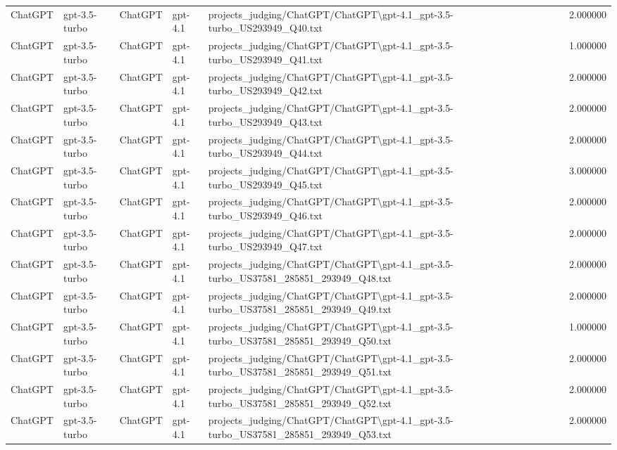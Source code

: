 \begin{table}[H]
\begin{tabular}{lllllr}
ChatGPT & gpt-3.5-turbo & ChatGPT & gpt-4.1 & projects\_judging/ChatGPT/ChatGPT\textbackslash gpt-4.1\_gpt-3.5-turbo\_US293949\_Q40.txt & 2.000000 \\
ChatGPT & gpt-3.5-turbo & ChatGPT & gpt-4.1 & projects\_judging/ChatGPT/ChatGPT\textbackslash gpt-4.1\_gpt-3.5-turbo\_US293949\_Q41.txt & 1.000000 \\
ChatGPT & gpt-3.5-turbo & ChatGPT & gpt-4.1 & projects\_judging/ChatGPT/ChatGPT\textbackslash gpt-4.1\_gpt-3.5-turbo\_US293949\_Q42.txt & 2.000000 \\
ChatGPT & gpt-3.5-turbo & ChatGPT & gpt-4.1 & projects\_judging/ChatGPT/ChatGPT\textbackslash gpt-4.1\_gpt-3.5-turbo\_US293949\_Q43.txt & 2.000000 \\
ChatGPT & gpt-3.5-turbo & ChatGPT & gpt-4.1 & projects\_judging/ChatGPT/ChatGPT\textbackslash gpt-4.1\_gpt-3.5-turbo\_US293949\_Q44.txt & 2.000000 \\
ChatGPT & gpt-3.5-turbo & ChatGPT & gpt-4.1 & projects\_judging/ChatGPT/ChatGPT\textbackslash gpt-4.1\_gpt-3.5-turbo\_US293949\_Q45.txt & 3.000000 \\
ChatGPT & gpt-3.5-turbo & ChatGPT & gpt-4.1 & projects\_judging/ChatGPT/ChatGPT\textbackslash gpt-4.1\_gpt-3.5-turbo\_US293949\_Q46.txt & 2.000000 \\
ChatGPT & gpt-3.5-turbo & ChatGPT & gpt-4.1 & projects\_judging/ChatGPT/ChatGPT\textbackslash gpt-4.1\_gpt-3.5-turbo\_US293949\_Q47.txt & 2.000000 \\
ChatGPT & gpt-3.5-turbo & ChatGPT & gpt-4.1 & projects\_judging/ChatGPT/ChatGPT\textbackslash gpt-4.1\_gpt-3.5-turbo\_US37581\_285851\_293949\_Q48.txt & 2.000000 \\
ChatGPT & gpt-3.5-turbo & ChatGPT & gpt-4.1 & projects\_judging/ChatGPT/ChatGPT\textbackslash gpt-4.1\_gpt-3.5-turbo\_US37581\_285851\_293949\_Q49.txt & 2.000000 \\
ChatGPT & gpt-3.5-turbo & ChatGPT & gpt-4.1 & projects\_judging/ChatGPT/ChatGPT\textbackslash gpt-4.1\_gpt-3.5-turbo\_US37581\_285851\_293949\_Q50.txt & 1.000000 \\
ChatGPT & gpt-3.5-turbo & ChatGPT & gpt-4.1 & projects\_judging/ChatGPT/ChatGPT\textbackslash gpt-4.1\_gpt-3.5-turbo\_US37581\_285851\_293949\_Q51.txt & 2.000000 \\
ChatGPT & gpt-3.5-turbo & ChatGPT & gpt-4.1 & projects\_judging/ChatGPT/ChatGPT\textbackslash gpt-4.1\_gpt-3.5-turbo\_US37581\_285851\_293949\_Q52.txt & 2.000000 \\
ChatGPT & gpt-3.5-turbo & ChatGPT & gpt-4.1 & projects\_judging/ChatGPT/ChatGPT\textbackslash gpt-4.1\_gpt-3.5-turbo\_US37581\_285851\_293949\_Q53.txt & 2.000000 \\

\end{tabular}
\end{table}
